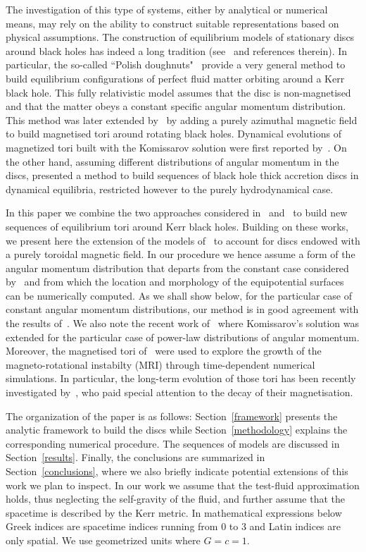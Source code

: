 \documentclass{aa}
\begin{document}
The investigation of this type of systems, either by analytical or numerical means, may rely on the ability to construct suitable 
representations based on physical assumptions. The construction of equilibrium models of stationary discs around black holes has indeed a long tradition (see~\cite{Abramowicz:2013} and references therein). In particular, the so-called ``Polish doughnuts"~\citep{Abramowicz:1978,Kozlowski:1978} provide a  very general method to build equilibrium configurations of perfect fluid matter orbiting around a Kerr black hole. This fully relativistic model assumes that the disc is non-magnetised and that the matter obeys a  constant specific angular momentum distribution. This method was later extended by~\cite{Komissarov:2006}  by adding a purely azimuthal magnetic field to build magnetised tori around rotating black holes. Dynamical evolutions of magnetized tori built with the Komissarov solution were first reported by~\cite{Montero:2007}.
On the other hand, assuming different distributions of angular momentum in the discs, \citet{Qian:2009} presented a method to build sequences of black hole thick accretion discs in dynamical equilibria, restricted however to the purely hydrodynamical case. 
 
 In this paper we combine the two approaches considered in~\cite{Komissarov:2006} and~\citet{Qian:2009} to build new sequences of equilibrium tori around Kerr black holes. Building on these works, we present here the extension of the models of~\citet{Qian:2009} to account for discs endowed with a purely toroidal magnetic field. In our procedure we hence assume a form of the angular momentum distribution that departs from the constant case considered by~\cite{Komissarov:2006} and from which the location and morphology of the equipotential surfaces can be numerically computed. As we shall show below, for the particular case of constant angular momentum distributions, our method is in good agreement with the results of~\citet{Komissarov:2006}. We also note the recent work of~\citet{Wielgus:2015} where Komissarov's solution was extended for the particular case of power-law distributions of angular momentum. Moreover, the magnetised tori of~\citet{Wielgus:2015} were used to explore the growth of the magneto-rotational instabilty (MRI) through time-dependent numerical simulations. In particular, the long-term evolution of those tori has been recently investigated by~\citet{Fragile:2017}, who paid special attention to the decay of their magnetisation. 

The organization of the paper is as follows: Section~\ref{framework} presents the analytic framework to build the discs while Section~\ref{methodology} explains the corresponding numerical procedure. The sequences of models are discussed in Section~\ref{results}. Finally, the conclusions are summarized in Section~\ref{conclusions}, where we also briefly indicate potential extensions of this work we plan to inspect. In our work we assume that the test-fluid approximation holds, thus neglecting the self-gravity of the fluid, and further assume that the spacetime is described by the Kerr metric. In mathematical expressions below Greek indices are spacetime indices running from 0 to 3 and Latin indices are only spatial. We use geometrized units where $G = c = 1$.
\end{document}

